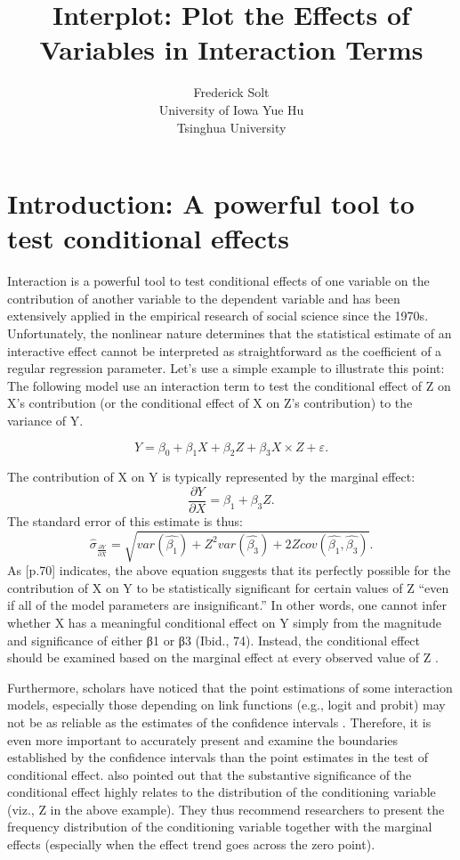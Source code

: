 \documentclass[
  article]{jss}
\author{Frederick Solt\\University of Iowa \And Yue Hu\\Tsinghua
University}
\title{Interplot: Plot the Effects of Variables in Interaction Terms}
\begin{document}
\maketitle
\hypertarget{sec-introduction-apowerful-tool-to-test-conditional-effects}{%
\section{Introduction: A powerful tool to test conditional
effects}\label{sec-introduction-apowerful-tool-to-test-conditional-effects}}

Interaction is a powerful tool to test conditional effects of one
variable on the contribution of another variable to the dependent
variable and has been extensively applied in the empirical research of
social science since the 1970s\citep{Wright1976}. Unfortunately, the
nonlinear nature determines that the statistical estimate of an
interactive effect cannot be interpreted as straightforward as the
coefficient of a regular regression parameter. Let's use a simple
example to illustrate this point: The following model use an interaction
term to test the conditional effect of Z on X's contribution (or the
conditional effect of X on Z's contribution) to the variance of Y.

\[
Y = \beta_0 + \beta_1X + \beta_2Z + \beta_3X\times Z + \varepsilon.
\]

The contribution of X on Y is typically represented by the marginal
effect: \[
\frac{\partial Y}{\partial X} = \beta_1 + \beta_3Z.
\] The standard error of this estimate is thus: \[
\hat{\sigma}_{\frac{\partial Y}{\partial X}} = \sqrt{var(\hat{\beta_1}) + Z^2var(\hat{\beta_3}) + 2Zcov(\hat{\beta_1}, \hat{\beta_3})}.
\] As \citep{BramborClarkGolder2006}{[}p.70{]} indicates, the above
equation suggests that its perfectly possible for the contribution of X
on Y to be statistically significant for certain values of Z ``even if
all of the model parameters are insignificant.'' In other words, one
cannot infer whether X has a meaningful conditional effect on Y simply
from the magnitude and significance of either β1 or β3 (Ibid., 74).
Instead, the conditional effect should be examined based on the marginal
effect at every observed value of Z
\citep{BerryGolderMilton2012, BramborClarkGolder2006, Braumoeller2004}.

Furthermore, scholars have noticed that the point estimations of some
interaction models, especially those depending on link functions (e.g.,
logit and probit) may not be as reliable as the estimates of the
confidence intervals \citep{BerryDeMerittEsarey2016}. Therefore, it is
even more important to accurately present and examine the boundaries
established by the confidence intervals than the point estimates in the
test of conditional effect. \citep{BerryGolderMilton2012} also pointed
out that the substantive significance of the conditional effect highly
relates to the distribution of the conditioning variable (viz., Z in the
above example). They thus recommend researchers to present the frequency
distribution of the conditioning variable together with the marginal
effects (especially when the effect trend goes across the zero point).
\end{document}
